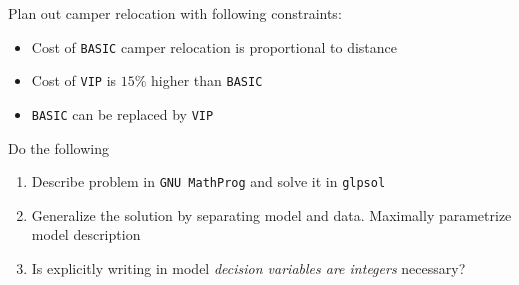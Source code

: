 Plan out camper relocation with following constraints:
\begin{itemize}
    \item Cost of \texttt{BASIC} camper relocation is proportional to distance
    \item Cost of \texttt{VIP} is $15\%$ higher than \texttt{BASIC}
    \item \texttt{BASIC} can be replaced by \texttt{VIP}
\end{itemize}
Do the following
\begin{enumerate}
    \item Describe problem in \texttt{GNU MathProg} and solve it in \texttt{glpsol} \notdone
    \item Generalize the solution by separating model and data. Maximally parametrize model description \notdone
    \item Is explicitly writing in model \textit{decision variables are integers} necessary? \notdone
\end{enumerate}
